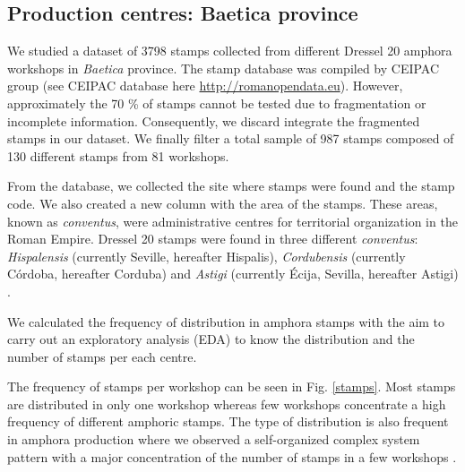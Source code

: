 \documentclass[review]{elsarticle}
\newcommand{\memo}[2]{\textcolor{#1}{#2}}
\newcommand{\xavi}[1]{\memo{magenta}{XRC: #1\\}}
\begin{document}
\subsection{Production centres: Baetica province}

We studied a dataset of 3798 stamps collected from different Dressel 20 amphora workshops in \textit{Baetica} province. The stamp database was compiled by CEIPAC group \citep{remesal_centro_2015} (see CEIPAC database here \url{http://romanopendata.eu}). However, approximately the 70 \% of stamps cannot be tested due to fragmentation or incomplete information. Consequently, we discard integrate the fragmented stamps in our dataset. We finally filter a total sample of 987 stamps composed of 130 different stamps from 81 workshops. 



From the database, we collected the site where stamps were found and the stamp code. We also created a new column with the area of the stamps. These areas, known as \textit{conventus}, were administrative centres for territorial organization in the Roman Empire. Dressel 20 stamps were found in three different \textit{conventus}: \textit{Hispalensis} (currently Seville, hereafter Hispalis), \textit{Cordubensis} (currently C\'ordoba, hereafter Corduba) and \textit{Astigi} (currently Écija, Sevilla, hereafter Astigi) \citep{rodriguez_economioleicola_1977,
chicdatos2001,berni_millet_epigrafianforica_2008} .


We calculated the frequency of distribution in amphora stamps with the aim to carry out an exploratory analysis (EDA) to know the distribution and the number of stamps per each centre.  

The frequency of stamps per workshop can be seen in Fig. \ref{stamps}. Most stamps are distributed in only one workshop whereas few workshops concentrate a high frequency of different amphoric stamps. The type of distribution is also frequent in amphora production where we observed a self-organized complex system pattern with a major concentration of the number of stamps in a few workshops \citep{bayesian_2018,coto-sarmiento_identifying_2018}.
\end{document}
